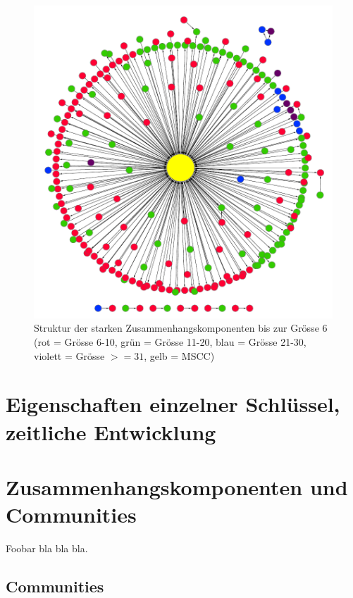 \begin{figure}[t]
  \centering
  \includegraphics[scale=1.0]{images/component-metagraph-8.pdf}
  \caption{Struktur der starken Zusammenhangskomponenten bis zur
    Grösse 6 (rot = Grösse 6-10, grün = Grösse 11-20, blau = Grösse
    21-30, violett = Grösse $>= 31$, gelb = MSCC)}
  \label{fig:komponenten-struktur}
\end{figure}


\section{Eigenschaften einzelner Schl\"ussel, zeitliche Entwicklung}
\label{sec:result-key-properties}

\section{Zusammenhangskomponenten und Communities}
\label{sec:result-zusamm-und-comm}




Foobar bla bla bla.

\subsection{Communities}
\label{sec:result-communities}

